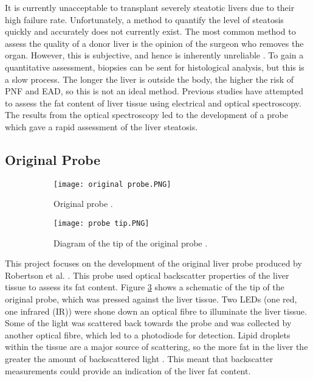 It is currently unacceptable to transplant severely steatotic livers due to their high failure rate. Unfortunately, a method to quantify the level of steatosis quickly and accurately does not currently exist. The most common method to assess the quality of a donor liver is the opinion of the surgeon who removes the organ. However, this is subjective, and hence is inherently unreliable \cite{Robertson}. To gain a quantitative assessment, biopsies can be sent for histological analysis, but this is a slow process. The longer the liver is outside the body, the higher the risk of PNF and EAD, so this is not an ideal method. Previous studies \cite{McLaughlin2010} have attempted to assess the fat content of liver tissue using electrical and optical spectroscopy. The results from the optical spectroscopy led to the development of a probe \cite{Robertson} which gave a rapid assessment of the liver steatosis. 


\subsection{Original Probe}

\begin{figure}[htb]
	\centering
	\begin{subfigure}[b]{0.3\linewidth}
		\texttt{[image: original probe.PNG]}
		\caption{Original probe \cite{Robertson}.}
		\label{fig: original probe}
	\end{subfigure}
	\begin{subfigure}[b]{0.5\linewidth}
		\texttt{[image: probe tip.PNG]}
		\caption{Diagram of the tip of the original probe \cite{Robertson}.}
		\label{fig: probe tip}
	\end{subfigure}
	\caption{}
\end{figure}

This project focuses on the development of the original liver probe produced by Robertson et al. \cite{Robertson}. This probe used optical backscatter properties of the liver tissue to assess its fat content. Figure \ref{fig: probe tip} shows a schematic of the tip of the original probe, which was pressed against the liver tissue. Two LEDs (one red, one infrared (IR)) were shone down an optical fibre to illuminate the liver tissue. Some of the light was scattered back towards the probe and was collected by another optical fibre, which led to a photodiode for detection. Lipid droplets within the tissue are a major source of scattering, so the more fat in the liver the greater the amount of backscattered light \cite{McLaughlin}. This meant that backscatter measurements could provide an indication of the liver fat content.\\

